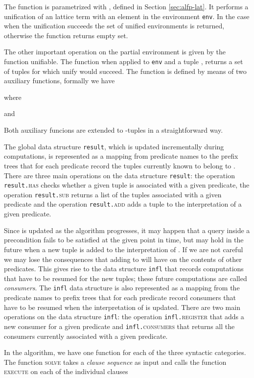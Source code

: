 The function is parametrized with , defined
in Section \ref{sec:alfp-lat}. It performs a unification of an lattice
term  with an element  in the environment {\tt env}. In
the case when the unification succeeds the set of unified environments
is returned, otherwise the function returns empty set.

The other important operation on the partial environment is given by
the function {\sc unifiable}. The function when applied to {\tt env}
and a tuple , returns a set of tuples for which {\sc
  unify} would succeed. The function is defined by means of two
auxiliary functions, formally we have

where

and

Both auxiliary funcions are extended to -tuples in a
straightforward way.

The global data structure \texttt{result}, which is updated
incrementally during computations, is represented as a mapping from
predicate names to the prefix trees that for each predicate  record
the tuples currently known to belong to . There are three main
operations on the data structure \texttt{result}: the operation
\texttt{result.}\textsc{has} checks whether a given tuple is
associated with a given predicate, the operation
\texttt{result.}\textsc{sub} returns a list of the tuples associated
with a given predicate and the operation \texttt{result.}\textsc{add}
adds a tuple to the interpretation of a given predicate.

Since  is updated as the algorithm progresses, it may
happen that a query  inside a precondition fails to be
satisfied at the given point in time, but may hold in the future when
a new tuple  is added to the interpretation of . If we
are not careful we may lose the consequences that adding 
to  will have on the contents of other predicates. This gives rise
to the data structure \texttt{infl} that records computations that
have to be resumed for the new tuples; these future computations are
called \emph{consumers}. The \texttt{infl} data structure is also
represented as a mapping from the predicate names to prefix trees that
for each predicate  record consumers that have to be resumed when
the interpretation of  is updated. There are two main operations on
the data structure {\tt infl}: the operation
\texttt{infl.}\textsc{register} that adds a new consumer for a given
predicate and \texttt{infl.}\textsc{consumers} that returns all the
consumers currently associated with a given predicate.

In the algorithm, we have one function for each of the three syntactic
categories. The function \textsc{solve} takes a \emph{clause sequence}
as input and calls the function \textsc{execute} on each of the
individual clauses


